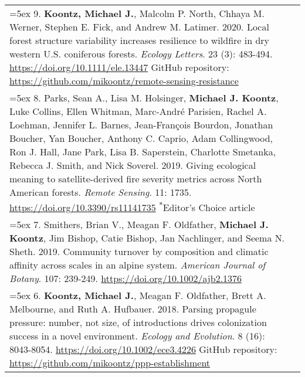 \begin{longtable}{@{}>{\raggedright}p{6.10in} >{\raggedleft}X @{}}
\hangindent=5ex 9. \textbf{Koontz, Michael J.}, Malcolm P. North, Chhaya M. Werner, Stephen E. Fick, and Andrew M. Latimer. 2020. Local forest structure variability increases resilience to wildfire in dry western U.S. coniferous forests. \emph{Ecology Letters}. 23 (3): 483-494. \href{https://doi.org/10.1111/ele.13447}{https://doi.org/10.1111/ele.13447} 
\newline GitHub repository: \href{https://github.com/mikoontz/remote-sensing-resistance}{https://github.com/mikoontz/remote-sensing-resistance} & \tabularnewline

\hangindent=5ex 8. Parks, Sean A., Lisa M. Holsinger, \textbf{Michael J. Koontz}, Luke Collins, Ellen Whitman, Marc-Andr\'e Parisien, Rachel A. Loehman, Jennifer L. Barnes, Jean-Fran\c{c}ois Bourdon, Jonathan Boucher, Yan Boucher, Anthony C. Caprio, Adam Collingwood, Ron J. Hall, Jane Park, Lisa B. Saperstein, Charlotte Smetanka, Rebecca J. Smith, and Nick Soverel. 2019. Giving ecological meaning to satellite-derived fire severity metrics across North American forests. \emph{Remote Sensing}. 11: 1735. \href{https://doi.org/10.3390/rs11141735}{https://doi.org/10.3390/rs11141735} \newline \textsuperscript{*}Editor's Choice article & \tabularnewline

\hangindent=5ex 7. Smithers, Brian V., Meagan F. Oldfather, \textbf{Michael J. Koontz}, Jim Bishop, Catie Bishop, Jan Nachlinger, and Seema N. Sheth. 2019. Community turnover by composition and climatic affinity across scales in an alpine system. \emph{American Journal of Botany}. 107: 239-249. \href{https://doi.org/10.1002/ajb2.1376}{https://doi.org/10.1002/ajb2.1376} & \tabularnewline

\hangindent=5ex 6. \textbf{Koontz, Michael J.}, Meagan F. Oldfather, Brett A. Melbourne, and Ruth A. Hufbauer. 2018. Parsing propagule pressure: number, not size, of introductions drives colonization success in a novel environment. \emph{Ecology and Evolution}. 8 (16): 8043-8054. \href{https://doi.org/10.1002/ece3.4226}{https://doi.org/10.1002/ece3.4226}
\newline GitHub repository: \href{https://github.com/mikoontz/ppp-establishment}{https://github.com/mikoontz/ppp-establishment} & \tabularnewline


\end{longtable}
